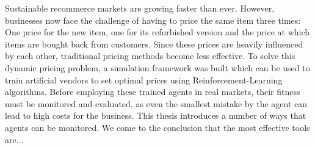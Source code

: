 Sustainable recommerce markets are growing faster than ever. However, businesses now face the challenge of having to price the same item three times: One price for the new item, one for its refurbished version and the price at which items are bought back from customers. Since these prices are heavily influenced by each other, traditional pricing methods become less effective. To solve this dynamic pricing problem, a simulation framework was built which can be used to train artificial vendors to set optimal prices using Reinforcement-Learning algorithms.
Before employing these trained agents in real markets, their fitness must be monitored and evaluated, as even the smallest mistake by the agent can lead to high costs for the business. This thesis introduces a number of ways that agents can be monitored. We come to the conclusion that the most effective tools are...  